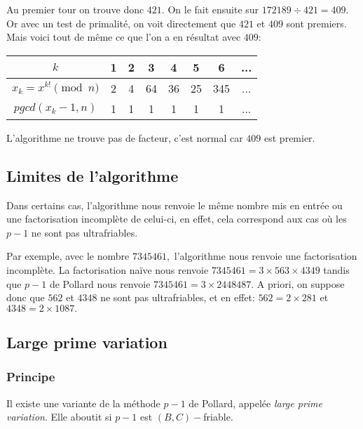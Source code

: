 \documentclass[french, 12pt, titlepage]{article}
\begin{document}
Au premier tour on trouve donc $421.$ On le fait ensuite sur $172189 \div 421 = 409.$ Or avec un test de primalité, on voit directement que $421$ et $409$ sont premiers. Mais voici tout de même ce que l'on a en résultat avec $409:$ 

\begin{center}
\begin{tabular}{|c||c|c|c|c|c|c|c|}
\hline
$k$ & 1 & 2 & 3 & 4 & 5 & 6 & ... \\
\hline
$x_k = x^{k!} \pmod n$ & 2 & 4 & 64 & 36 & 25 & 345 & ... \\
\hline
$pgcd(x_k -1, n)$ & 1 & 1 & 1 & 1 & 1 & 1 & ...\\
\hline
\end{tabular}
\end{center}

L'algorithme ne trouve pas de facteur, c'est normal car $409$ est premier.

\subsection{Limites de l'algorithme}

Dans certains cas, l'algorithme nous renvoie le même nombre mis en entrée ou une factorisation incomplète de celui-ci, en effet, cela correspond aux cas où les $p-1$ ne sont pas ultrafriables.

Par exemple, avec le nombre $7345461,$ l'algorithme nous renvoie une factorisation incomplète.
La factorisation naïve nous renvoie $7345461 = 3 \times 563 \times 4349$ tandis que $p-1$ de Pollard nous renvoie $7345461 = 3 \times 2448487.$
A priori, on suppose donc que $562$ et $4348$ ne sont pas ultrafriables, et en effet:
$562 = 2 \times 281$ et $4348 = 2 \times 1087.$

\subsection{Large prime variation}
\subsubsection{Principe}
Il existe une variante de la méthode $p - 1$ de Pollard, appelée \textit{large prime variation}. 
Elle aboutit si $p - 1$ est $(B, C)-$friable.
\end{document}
